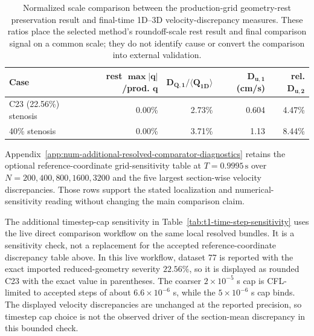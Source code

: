 \begin{table}[!htb]
    \centering
    \scriptsize
    \caption{Normalized scale comparison between the production-grid
    geometry-rest preservation result and final-time 1D--3D
    velocity-discrepancy measures. These ratios place the selected method's
    roundoff-scale rest result and final comparison signal on a common scale;
    they do not identify cause or convert the comparison into external
    validation.}
    \label{tab:t1-normalized-scale-comparison}
    \begin{tabular}{@{}lrrrr@{}}
        \toprule
        \textbf{Case}
            & \textbf{rest }$\boldsymbol{\max |q|}$\textbf{/prod. }$\boldsymbol{q}$
            & $\boldsymbol{D_{Q,1}/\langle Q_{1D}\rangle}$
            & $\boldsymbol{D_{u,1}}$ \textbf{(cm/s)}
            & \textbf{rel. }$\boldsymbol{D_{u,2}}$ \\
        \midrule
        C23 (22.56\%) stenosis & 0.00\% & 2.73\% & 0.604 & 4.47\% \\
        40\% stenosis & 0.00\% & 3.71\% & 1.13 & 8.44\% \\
        \bottomrule
    \end{tabular}
    \end{table}

Appendix~\ref{app:num-additional-resolved-comparator-diagnostics} retains the
optional reference-coordinate grid-sensitivity table at
$T=0.9995\,\mathrm{s}$ over $N=200,400,800,1600,3200$ and the five largest
section-wise velocity discrepancies. Those rows support the stated
localization and numerical-sensitivity reading without changing the main
comparison claim.

The additional timestep-cap sensitivity in Table~\ref{tab:t1-time-step-sensitivity}
uses the live direct comparison workflow on the same local resolved bundles.
It is a sensitivity check, not a replacement for the accepted
reference-coordinate discrepancy table above. In this live workflow, dataset 77
is reported with the exact imported reduced-geometry severity $22.56\%$, so it
is displayed as rounded C23 with the exact value in parentheses. The coarser
$2\times10^{-5}$ s cap is CFL-limited to accepted steps of about
$6.6\times10^{-6}$ s, while the $5\times10^{-6}$ s cap binds. The displayed
velocity discrepancies are unchanged at the reported precision, so timestep cap
choice is not the observed driver of the section-mean discrepancy in this
bounded check.

\begin{table}[!htb]
    \centering
    \scriptsize
    \caption{Additional final-time timestep-cap sensitivity for the live
    direct resolved-velocity comparison at $N=400$. The rows keep the same
    reference-coordinate section observation operator and report discrepancy
    metrics in cm/s, except for relative RMS.}
    \label{tab:t1-time-step-sensitivity}
    \resizebox{\textwidth}{!}{%
    
    }
\end{table}

